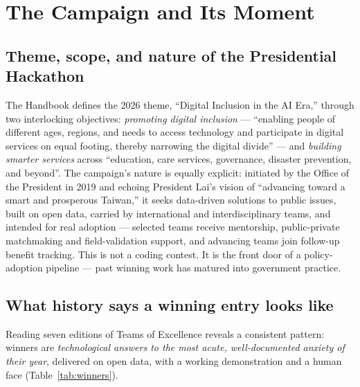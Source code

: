 \section{The Campaign and Its Moment}\label{sec:campaign}

\subsection{Theme, scope, and nature of the Presidential Hackathon}

The Handbook defines the 2026 theme, ``Digital Inclusion in the AI Era,''
through two interlocking objectives: \emph{promoting digital inclusion} ---
``enabling people of different ages, regions, and needs to access technology
and participate in digital services on equal footing, thereby narrowing the
digital divide'' --- and \emph{building smarter services} across ``education,
care services, governance, disaster prevention, and
beyond''\cite{handbook}. The campaign's nature is equally explicit: initiated
by the Office of the President in 2019 and echoing President Lai's vision of
``advancing toward a smart and prosperous Taiwan,'' it seeks data-driven
solutions to public issues, built on open data, carried by international and
interdisciplinary teams, and intended for real adoption --- selected teams
receive mentorship, public-private matchmaking and field-validation support,
and advancing teams join follow-up benefit tracking\cite{handbook,moda}. This
is not a coding contest. It is the front door of a policy-adoption pipeline
--- past winning work has matured into government
practice\cite{pmc}.

\subsection{What history says a winning entry looks like}

Reading seven editions of Teams of Excellence reveals a consistent pattern:
winners are \emph{technological answers to the most acute, well-documented
anxiety of their year}, delivered on open data, with a working demonstration
and a human face (Table~\ref{tab:winners}).

